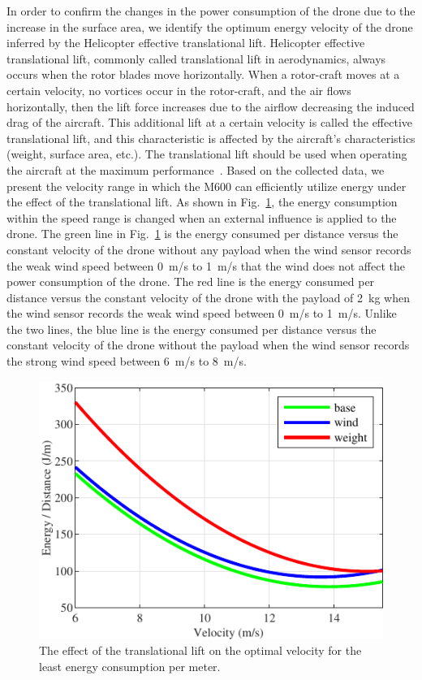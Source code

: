 \documentclass[journal]{./template/IEEEtran}
\begin{document}
In order to confirm the changes in the power consumption of the drone due to the increase in the surface area, we identify the optimum energy velocity of the drone inferred by the Helicopter effective translational lift.
Helicopter effective translational lift, commonly called translational lift in aerodynamics, always occurs when the rotor blades move horizontally. 
When a rotor-craft moves at a certain velocity, no vortices occur in the rotor-craft, and the air flows horizontally, then the lift force increases due to the airflow decreasing the induced drag of the aircraft. 
This additional lift at a certain velocity is called the effective translational lift, and this characteristic is affected by the aircraft's characteristics (weight, surface area, etc.). 
The translational lift should be used when operating the aircraft at the maximum performance~\cite{ref_20}.
Based on the collected data, we present the velocity range in which the M600 can efficiently utilize energy under the effect of the translational lift. 
As shown in Fig.~\ref{fig: lift}, the energy consumption within the speed range is changed when an external influence is applied to the drone.
The green line in Fig.~\ref{fig: lift} is the energy consumed per distance versus the constant velocity of the drone without any payload when the wind sensor records the weak wind speed between 0~m/s to 1~m/s that the wind does not affect the power consumption of the drone.
The red line is the energy consumed per distance versus the constant velocity of the drone with the payload of 2~kg when the wind sensor records the weak wind speed between 0~m/s to 1~m/s.
Unlike the two lines, the blue line is the energy consumed per distance versus the constant velocity of the drone without the payload when the wind sensor records the strong wind speed between 6~m/s to 8~m/s. 


\begin{figure}[ht]
\centering\includegraphics[scale=1.0]{fig10/t_lift.pdf}
\caption{The effect of the translational lift on the optimal velocity for the least energy consumption per meter.}
\label{fig: lift}
\end{figure}
\end{document}
